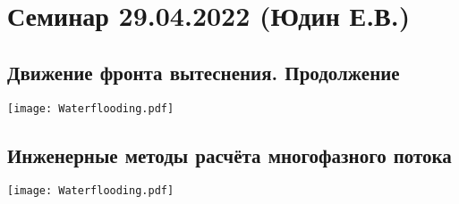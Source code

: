 \documentclass[main.tex]{subfiles}
\begin{document}
\section{Семинар 29.04.2022 (Юдин Е.В.)}

\subsection{Движение фронта вытеснения. Продолжение}

\texttt{[image: Waterflooding.pdf]}






\subsection{Инженерные методы расчёта многофазного потока}

\texttt{[image: Waterflooding.pdf]}









\end{document}
